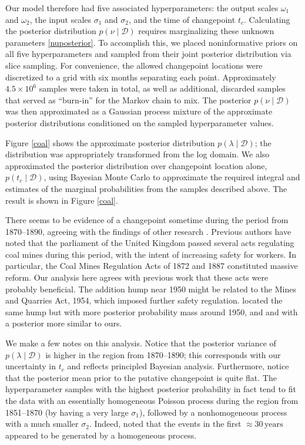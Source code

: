 \documentclass{article}
\newcommand{\cm}[1]{\mathcal{#1}}
\newcommand{\data}{\cm{D}}
\newcommand{\given}{\mid}
\begin{document}
Our model therefore had five associated hyperparameters: the output
scales $\omega_1$ and $\omega_2$, the input scales $\sigma_1$ and
$\sigma_2$, and the time of changepoint $t_c$.  Calculating the
posterior distribution $p(\nu \given \data)$ requires marginalizing
these unknown parameters \eqref{nuposterior}.  To accomplish this, we
placed noninformative priors on all five hyperparameters and sampled
from their joint posterior distribution via slice sampling.  For
convenience, the allowed changepoint locations were discretized to a
grid with six months separating each point.  Approximately $4.5 \times
10^6$ samples were taken in total, as well as additional, discarded
samples that served as ``burn-in'' for the Markov chain to mix.  The
posterior $p(\nu \given \data)$ was then approximated as a Gaussian
process mixture of the approximate posterior distributions conditioned
on the sampled hyperparameter values.

Figure \ref{coal} shows the approximate posterior
distribution $p(\lambda \given \data)$; the distribution was
appropriately transformed from the log domain.  We also approximated
the posterior distribution over changepoint location alone, $p(t_c
\given \data)$, using Bayesian Monte Carlo to approximate the required
integral \citep{bmc} and estimates of the marginal probabilities from
the samples described above.  The result is shown in Figure
\ref{coal}.

There seems to be evidence of a changepoint sometime during the period
from 1870--1890, agreeing with the findings of other research
\citep{jarrett, youngkuo, rafteryakman, westogden, fearnhead,
  adamscp}.  Previous authors have noted that the parliament of the
United Kingdom passed several acts regulating coal mines during this
period, with the intent of increasing safety for workers.  In
particular, the Coal Mines Regulation Acts of 1872 and 1887
constituted massive reform.  Our analysis here agrees with previous
work that these acts were probably beneficial.  The addition hump near
1950 might be related to the Mines and Quarries Act, 1954, which
imposed further safety regulation.  \citet{fearnhead} located the same
hump but with more posterior probability mass around 1950, and
\citet{carlin} and \citet{adamscp} with a posterior more similar to
ours.

We make a few notes on this analysis.  Notice that the posterior
variance of $p(\lambda \given \data)$ is higher in the region from
1870--1890; this corresponds with our uncertainty in $t_c$ and
reflects principled Bayesian analysis.  Furthermore, notice that the
posterior mean prior to the putative changepoint is quite flat.  The
hyperparameter samples with the highest posterior probability in fact
tend to fit the data with an essentially homogeneous Poisson process
during the region from 1851--1870 (by having a very large $\sigma_1$),
followed by a nonhomogeneous process with a much smaller $\sigma_2$.
Indeed, \citet{jarrett} noted that the events in the first $\approx
\!30\,\text{years}$ appeared to be generated by a homogeneous process.
\end{document}
